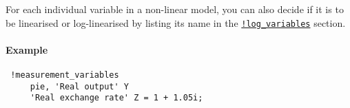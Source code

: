  For each individual variable in a non-linear model, you can also decide
 if it is to be linearised or log-linearised by listing its name in the
 \href{modellang/logvariables}{\texttt{!log\_variables}} section.
 
 \paragraph{Example}
 
 \begin{verbatim}
 !measurement_variables
     pie, 'Real output' Y
     'Real exchange rate' Z = 1 + 1.05i;
 \end{verbatim}


